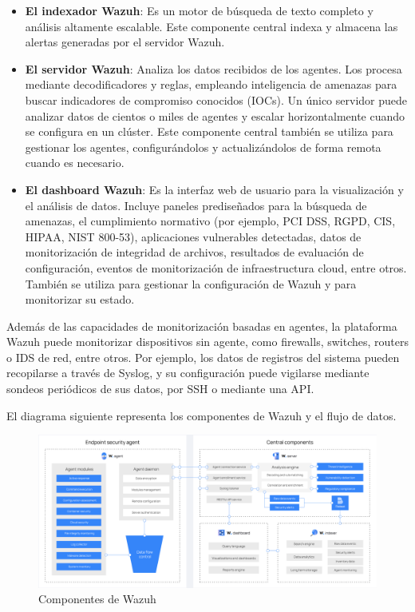 \begin{itemize}
  \item \textbf{El indexador Wazuh}: Es un motor de búsqueda de texto completo y análisis altamente escalable. Este componente central indexa y almacena las alertas generadas por el servidor Wazuh.

  \item \textbf{El servidor Wazuh}: Analiza los datos recibidos de los agentes. Los procesa mediante decodificadores y reglas, empleando inteligencia de amenazas para buscar indicadores de compromiso conocidos (IOCs). Un único servidor puede analizar datos de cientos o miles de agentes y escalar horizontalmente cuando se configura en un clúster. Este componente central también se utiliza para gestionar los agentes, configurándolos y actualizándolos de forma remota cuando es necesario.

  \item \textbf{El dashboard Wazuh}: Es la interfaz web de usuario para la visualización y el análisis de datos. Incluye paneles prediseñados para la búsqueda de amenazas, el cumplimiento normativo (por ejemplo, PCI DSS, RGPD, CIS, HIPAA, NIST 800-53), aplicaciones vulnerables detectadas, datos de monitorización de integridad de archivos, resultados de evaluación de configuración, eventos de monitorización de infraestructura cloud, entre otros. También se utiliza para gestionar la configuración de Wazuh y para monitorizar su estado.
\end{itemize}

Además de las capacidades de monitorización basadas en agentes, la plataforma Wazuh puede monitorizar dispositivos sin agente, como firewalls, switches, routers o IDS de red, entre otros. Por ejemplo, los datos de registros del sistema pueden recopilarse a través de Syslog, y su configuración puede vigilarse mediante sondeos periódicos de sus datos, por SSH o mediante una API.

El diagrama siguiente representa los componentes de Wazuh y el flujo de datos.
\begin{figure}[htbp]
  \centering
  \includegraphics[width=1.0\textwidth]{figures/wazuh-components-and-data-flow1.png}
  \caption{Componentes de Wazuh}
  \label{fig:wazuh-components-and-data-flow}
\end{figure}

